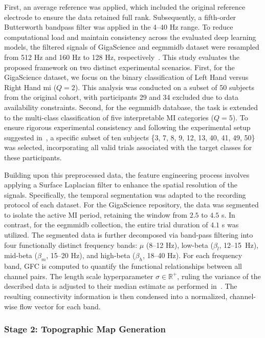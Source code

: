 First, an average reference was applied, which included the original reference electrode to ensure the data retained full rank. Subsequently, a fifth-order Butterworth bandpass filter was applied in the 4--40 Hz range. {To reduce computational load and maintain consistency across the evaluated deep learning models, the filtered signals of GigaScience and \gls{eegmmidb} dataset were resampled from 512 Hz and 160 Hz to 128 Hz, respectively~\cite{diagnostics13061122, computers12070145}. This study evaluates the proposed framework on two distinct experimental scenarios. First, for the GigaScience dataset, we focus on the binary classification of Left Hand versus Right Hand \gls{mi} ($Q=2$). This analysis was conducted on a subset of 50 subjects from the original cohort, with participants 29 and 34 excluded due to data availability constraints. Second, for the \gls{eegmmidb} database, the task is extended to the multi-class classification of five interpretable MI categories ($Q=5$). To ensure rigorous experimental consistency and following the experimental setup suggested in~\cite{bouchane2025hybrid}, a specific subset of ten subjects \{3, 7, 8, 9, 12, 13, 40, 41, 49, 50\} was selected, incorporating all valid trials associated with the target classes for these participants.}

Building upon this preprocessed data, the feature engineering process involves applying a Surface Laplacian filter to enhance the spatial resolution of the signals. {Specifically, the temporal segmentation was adapted to the recording protocol of each dataset. For the GigaScience repository, the data was segmented to isolate the active MI period, retaining the window from $2.5$ to $4.5$ s. In contrast, for the \gls{eegmmidb} collection, the entire trial duration of $4.1$ s was utilized.} The segmented data is further decomposed via band-pass filtering into four functionally distinct frequency bands: $\mu$ (8--12 Hz), low-beta ($\beta_l$, \mbox{12--15 Hz}), mid-beta ($\beta_m$, 15--20 Hz), and high-beta ($\beta_h$, 18--40 Hz). For each frequency band, GFC is computed to quantify the functional relationships between all channel pairs. The length scale hyperparameter $\sigma \in \mathbb{R}^+$, ruling the variance of the described data is adjusted to their median estimate as performed in~\cite{alvarez2014unsupervised}. The resulting connectivity information is then condensed into a normalized, channel-wise flow vector for each band. 

\subsubsection{Stage 2: Topographic Map Generation}

